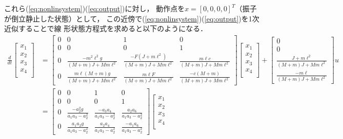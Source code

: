 これら(\ref{eq:nonlinsystem})(\ref{eq:output})に対し，
動作点を$x = [0, 0, 0, 0]^T$（振子が倒立静止した状態）として，
この近傍で(\ref{eq:nonlinsystem})(\ref{eq:output})を1次近似することで線
形状態方程式を求めると以下のようになる．
\begin{align}
 \frac{d}{dt}
 \left[
  \begin{array}{c}
   x_1 \\
   x_2 \\
   x_3 \\
   x_4 \\
  \end{array}
 \right] &=
 \left[
  \begin{array}{cccc}
   0 & 0 & 1 & 0 \\
   0 & 0 & 0 & 1 \\
   0 & \frac{-m^2\ell^2g}{(M+m)J+Mm\ell^2} &
    \frac{-F(J+m\ell^2)}{(M+m)J+Mm\ell^2} & \frac{m\ell c}{(M+m)J+Mm\ell^2} \\
   0 & \frac{m\ell(M+m)g}{(M+m)J+Mm\ell^2} &
    \frac{m\ell F}{(M+m)J+Mm\ell^2} & \frac{-c(M+m)}{(M+m)J+Mm\ell^2}
  \end{array}
 \right]
 \left[
  \begin{array}{c}
   x_1 \\
   x_2 \\
   x_3 \\
   x_4 \\
  \end{array}
 \right] +
 \left[
  \begin{array}{c}
   0 \\
   0 \\
   \frac{J+m\ell^2}{(M+m)J+Mm\ell^2} \\
   \frac{-m\ell}{(M+m)J+Mm\ell^2}
  \end{array}
 \right]u \\
 &=
 \left[
  \begin{array}{cccc}
   0 & 0 & 1 & 0 \\
   0 & 0 & 0 & 1 \\
   0 & \frac{-a_2^2g}{a_1a_3-a_2^2} &
    \frac{-a_3a_4}{a_1a_3-a_2^2} & \frac{a_2a_6}{a_1a_3-a_2^2} \\
   0 & \frac{a_1a_2g}{a_1a_3-a_2^2} &
    \frac{a_2a_4}{a_1a_3-a_2^2} & \frac{-a_1a_6}{a_1a_3-a_2^2}
  \end{array}
 \right]
 \left[
  \begin{array}{c}
   x_1 \\
   x_2 \\
   x_3 \\
   x_4 \\

\end{array}
\end{align}
